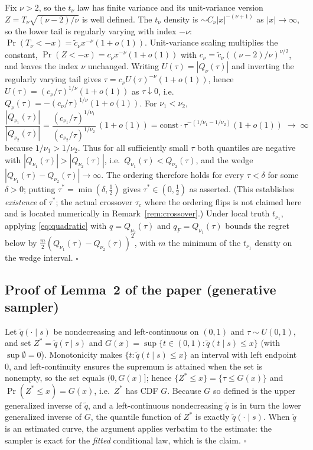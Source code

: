 \documentclass[11pt]{article}
\theoremstyle{remark}
\begin{document}
Fix $\nu>2$, so the $t_\nu$ law has finite variance and its
unit-variance version $Z=T_\nu\sqrt{(\nu-2)/\nu}$ is well defined. The
$t_\nu$ density is $\sim C_\nu|x|^{-(\nu+1)}$ as $|x|\to\infty$, so the
lower tail is regularly varying with index $-\nu$: $\Pr(T_\nu<-x)=
\tilde c_\nu x^{-\nu}(1+o(1))$. Unit-variance scaling multiplies the
constant, $\Pr(Z<-x)=c_\nu x^{-\nu}(1+o(1))$ with
$c_\nu=\tilde c_\nu((\nu-2)/\nu)^{\nu/2}$, and leaves the index $\nu$
unchanged. Writing $U(\tau)=|Q_\nu(\tau)|$ and inverting the regularly
varying tail \citep{embrechts1997} gives $\tau=c_\nu U(\tau)^{-\nu}
(1+o(1))$, hence $U(\tau)=(c_\nu/\tau)^{1/\nu}(1+o(1))$ as
$\tau\downarrow0$, i.e.\ $Q_\nu(\tau)=-(c_\nu/\tau)^{1/\nu}(1+o(1))$.
For $\nu_1<\nu_2$,
\[
\frac{|Q_{\nu_1}(\tau)|}{|Q_{\nu_2}(\tau)|}
=\frac{(c_{\nu_1}/\tau)^{1/\nu_1}}{(c_{\nu_2}/\tau)^{1/\nu_2}}\,(1+o(1))
=\text{const}\cdot\tau^{-(1/\nu_1-1/\nu_2)}(1+o(1))\;\longrightarrow\;\infty
\]
because $1/\nu_1>1/\nu_2$. Thus for all sufficiently small $\tau$ both
quantiles are negative with $|Q_{\nu_1}(\tau)|>|Q_{\nu_2}(\tau)|$, i.e.\
$Q_{\nu_1}(\tau)<Q_{\nu_2}(\tau)$, and the wedge
$|Q_{\nu_1}(\tau)-Q_{\nu_2}(\tau)|\to\infty$. The ordering therefore
holds for every $\tau<\delta$ for some $\delta>0$; putting
$\tau^*=\min(\delta,\tfrac12)$ gives $\tau^*\in(0,\tfrac12)$ as
asserted. (This establishes \emph{existence} of $\tau^*$; the actual
crossover $\tau_c$ where the ordering flips is not claimed here and is
located numerically in Remark~\ref{rem:crossover}.) Under local truth
$t_{\nu_1}$, applying \eqref{eq:quadratic} with $q=Q_{\nu_2}(\tau)$ and
$q_F=Q_{\nu_1}(\tau)$ bounds the regret below by
$\tfrac{m}{2}(Q_{\nu_1}(\tau)-Q_{\nu_2}(\tau))^2$, with $m$ the minimum
of the $t_{\nu_1}$ density on the wedge interval. \hfill$\square$

\subsection*{Proof of Lemma~2 of the paper (generative sampler)}
Let $\widetilde{q}(\cdot \mid s)$ be nondecreasing and left-continuous
on $(0,1)$ and $\tau \sim U(0,1)$, and set
$Z^*=\widetilde q(\tau\mid s)$ and
$G(x)=\sup\{t\in(0,1):\widetilde q(t\mid s)\le x\}$ (with
$\sup\emptyset=0$). Monotonicity makes
$\{t:\widetilde q(t\mid s)\le x\}$ an interval with left endpoint $0$,
and left-continuity ensures the supremum is attained when the set is
nonempty, so the set equals $(0,G(x)]$; hence
$\{Z^*\le x\}=\{\tau\le G(x)\}$ and
$\Pr(Z^*\le x)=G(x)$, i.e.\ $Z^*$ has CDF $G$. Because $G$ so defined
is the upper generalized inverse of $\widetilde q$, and a
left-continuous nondecreasing $\widetilde q$ is in turn the lower
generalized inverse of $G$, the quantile function of $Z^*$ is exactly
$\widetilde q(\cdot\mid s)$. When $\widetilde q$ is an estimated curve,
the argument applies verbatim to the estimate: the sampler is exact for
the \emph{fitted} conditional law, which is the claim. $\square$
\end{document}
